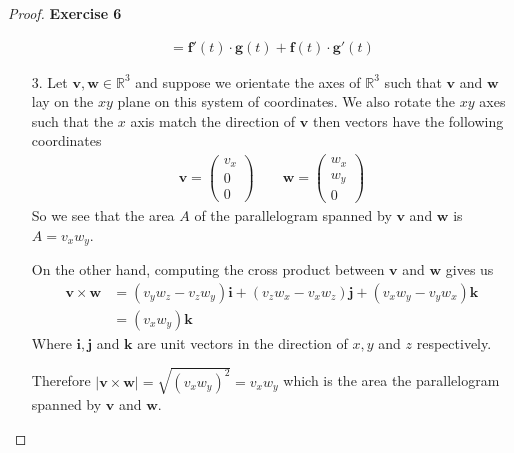 \documentclass[11pt]{article}
\newcommand{\R}{\mathbb{R}}
\newcommand{\uvi}{\bm{i}}
\newcommand{\uvj}{\bm{j}}
\newcommand{\uvk}{\bm{k}}
\theoremstyle{definition}
\begin{document}
\begin{proof}{\textbf{Exercise 6}}
\begin{itemize}
\begin{align*}
        = \bm{f}'(t) \cdot \bm{g}(t) + \bm{f}(t) \cdot \bm{g}'(t)
    \end{align*}
    \item [3.]
    Let $\bm{v},\bm{w} \in \R^3$ and suppose we orientate the axes of
    $\R^3$ such that $\bm{v}$ and $\bm{w}$ lay on the $xy$ plane on this
    system of coordinates. We also rotate the $xy$ axes such that the $x$
    axis match the direction of $\bm{v}$ then vectors have the following 
    coordinates
    \begin{align*}
        \bm{v} = \begin{pmatrix}
            v_x\\ 0\\ 0
        \end{pmatrix}
        \quad\quad
        \bm{w} = \begin{pmatrix}
            w_x\\ w_y\\ 0
        \end{pmatrix}
    \end{align*}
    So we see that the area $A$ of the parallelogram spanned by $\bm v$ and
    $\bm w$ is $A = v_x w_y$.

    On the other hand, computing the cross product between $\bm{v}$ and $\bm{w}$
    gives us
    \begin{align*}
        \bm{v} \times \bm{w} &= 
        (v_yw_z - v_zw_y)\uvi + (v_zw_x - v_xw_z)\uvj + (v_xw_y - v_yw_x)\uvk\\
        &= (v_xw_y) \uvk
    \end{align*}
    Where $\uvi, \uvj$ and $\uvk$ are unit vectors in the direction of $x,y$
    and $z$ respectively. 

    Therefore $|\bm{v} \times \bm{w}| = \sqrt{(v_xw_y)^2} = v_xw_y$
    which is the area the parallelogram spanned by $\bm v$ and $\bm w$.
\end{itemize}
\end{proof}
\cleardoublepage
\end{document}
